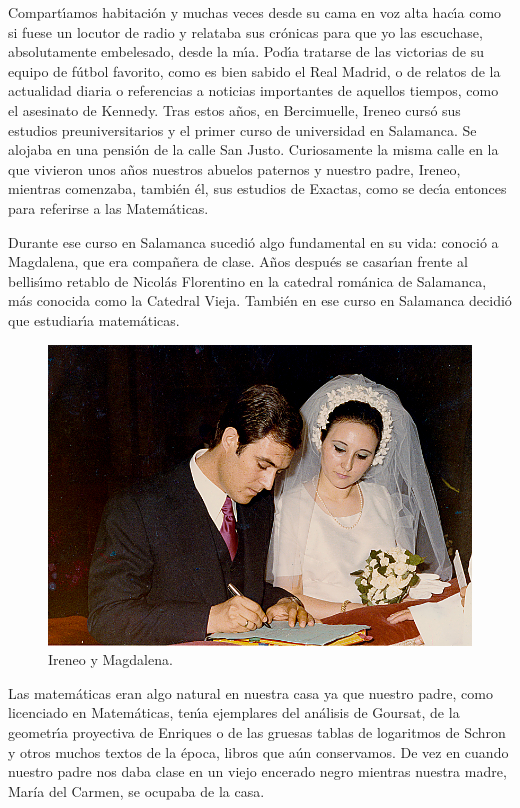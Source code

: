 Compart\'{\i}amos habitaci\'on y muchas veces desde su cama en voz alta hac\'{\i}a como si fuese un locutor de radio y  relataba sus cr\'onicas para que yo las escuchase, absolutamente embelesado,  desde la m\'{\i}a. Pod\'{\i}a tratarse de las victorias de su equipo de f\'utbol favorito, como es bien sabido el Real Madrid, o de relatos de la actualidad diaria o referencias a noticias importantes de aquellos tiempos,  como el asesinato de Kennedy.
Tras estos a\~nos, en Bercimuelle, Ireneo curs\'o sus estudios preuniversitarios y el primer curso de universidad en Salamanca. Se alojaba en una pensi\'on de la calle San Justo. Curiosamente la misma calle en la que vivieron unos a\~nos nuestros abuelos paternos y nuestro padre, Ireneo, mientras comenzaba, tambi\'en \'el, sus estudios de Exactas, como se dec\'{\i}a entonces para referirse  a las Matem\'aticas.

Durante ese curso en Salamanca  sucedi\'o algo fundamental en su vida: conoci\'o a Magdalena, que era compa\~nera de clase. 
A\~nos  despu\'es se casar\'{\i}an frente al bellis\'{\i}mo  retablo de Nicol\'as Florentino en la catedral rom\'anica de Salamanca,  m\'as conocida como la Catedral Vieja. 
Tambi\'en en  ese curso en Salamanca   decidi\'o que estudiar\'{\i}a matem\'aticas.

\begin{figure}%
\begin{center}
\includegraphics[width=0.9\linewidth]{IP_foto_boda.jpg}
\caption{Ireneo y Magdalena.}
\end{center}
\end{figure}


Las matem\'aticas eran algo natural en nuestra casa ya que nuestro padre, como licenciado en Matem\'aticas, ten\'{\i}a  ejemplares del an\'alisis de Goursat, de la geometr\'{\i}a proyectiva de Enriques o de las gruesas  tablas de logaritmos de Schron y otros  muchos textos de la \'epoca, libros  que a\'un conservamos.
De vez en cuando nuestro padre nos daba clase en un viejo encerado negro mientras nuestra madre, Mar\'ia del Carmen, se ocupaba de la casa.

